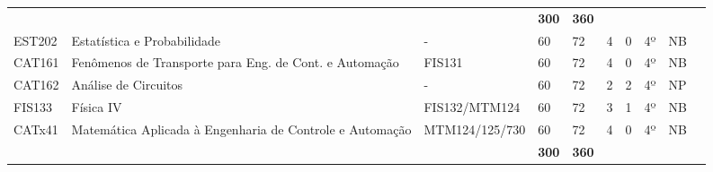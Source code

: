 \begin{table}[]
{\begin{tabular}{l|l|l|l|l|l|l|l|l|l}
			\multicolumn{1}{|l|}{}                              &                                                          &                               & \textbf{300}                                                 & \textbf{360}               &                          &                           &                            &                         &  \\ \cline{1-9}
			\multicolumn{1}{|l|}{EST202}                        & Estatística e Probabilidade                              & -                             & 60                                                           & 72                         & 4                        & 0                         & 4º                         & NB                      &  \\ \cline{1-9}
			\multicolumn{1}{|l|}{CAT161}                        & Fenômenos de Transporte para Eng. de Cont. e Automação   & FIS131                        & 60                                                           & 72                         & 4                        & 0                         & 4º                         & NB                      &  \\ \cline{1-9}
			\multicolumn{1}{|l|}{CAT162}                        & Análise de Circuitos                                     & -                             & 60                                                           & 72                         & 2                        & 2                         & 4º                         & NP                      &  \\ \cline{1-9}
			\multicolumn{1}{|l|}{FIS133}                        & Física IV                                                & FIS132/MTM124                 & 60                                                           & 72                         & 3                        & 1                         & 4º                         & NB                      &  \\ \cline{1-9}
			\multicolumn{1}{|l|}{CATx41}                        & Matemática Aplicada à Engenharia de Controle e Automação & MTM124/125/730                & 60                                                           & 72                         & 4                        & 0                         & 4º                         & NB                      &  \\ \cline{1-9}
			\multicolumn{1}{|l|}{}                              &                                                          &                               & \textbf{300}                                                 & \textbf{360}               &                          &                           &                            &                         &  \\ \cline{1-9}

\end{tabular}}
\end{table}
